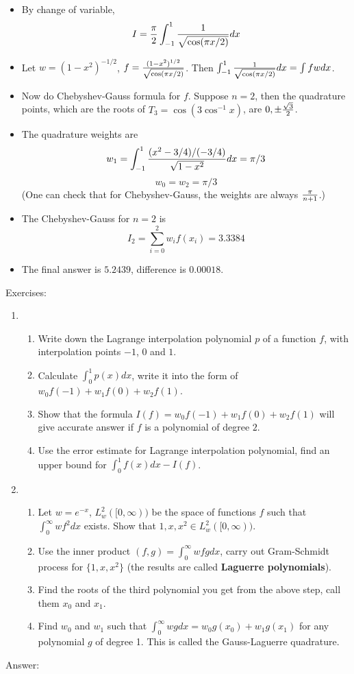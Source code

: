 \documentclass{article} %
\theoremstyle{break}
\begin{document}
\begin{itemize}
\item By change of variable,
  \[I={\pi\over 2}\int_{-1}^1{1\over\sqrt{\cos (\pi x/2)}}dx\]
\item Let $w=(1-x^2)^{-1/2}$, $f={(1-x^2)^{1/2}\over\sqrt{\cos (\pi x/2)}}$. Then $\int_{-1}^1{1\over\sqrt{\cos (\pi x/2)}}dx=\int fwdx$.
\item Now do Chebyshev-Gauss formula for $f$. Suppose $n=2$, then the quadrature points, which are the roots of $T_3=\cos(3\cos^{-1}x)$, are $0, \pm{\sqrt{3}\over 2}$.
\item The quadrature weights are
  \[w_1=\int_{-1}^1{(x^2-3/4)/(-3/4)\over\sqrt{1-x^2}}dx=\pi/3\]
  \[w_0=w_2=\pi/3\]
  (One can check that for Chebyshev-Gauss, the weights are always $\pi\over n+1$.)
\item The Chebyshev-Gauss for $n=2$ is
  \[I_2=\sum_{i=0}^2w_if(x_i)=3.3384\]
\item The final answer is $5.2439$, difference is $0.00018$.
\end{itemize}


Exercises:

\begin{enumerate}
\item \begin{enumerate}
  \item Write down the Lagrange interpolation polynomial $p$ of a function $f$, with interpolation points $-1$, $0$ and $1$.
  \item Calculate $\int_0^1p(x)dx$, write it into the form of $w_0f(-1)+w_1f(0)+w_2f(1)$.
\item Show that the formula $I(f)=w_0f(-1)+w_1f(0)+w_2f(1)$ will give accurate answer if $f$ is a polynomial of degree $2$.
  \item Use the error estimate for Lagrange interpolation polynomial, find an upper bound for $\int_0^1f(x)dx-I(f)$.
  \end{enumerate}
  \item \begin{enumerate}
    \item Let $w=e^{-x}$, $L^2_w([0, \infty))$ be the space of functions $f$ such that $\int_0^\infty wf^2dx$ exists. Show that $1, x, x^2\in L^2_w([0, \infty))$.
     \item Use the inner product $(f, g)=\int_0^\infty wfgdx$, carry out Gram-Schmidt process for $\{1, x, x^2\}$ (the results are called {\bf Laguerre polynomials}).
\item Find the roots of the third polynomial you get from the above step, call them $x_0$ and $x_1$.
    \item Find $w_0$ and $w_1$ such that $\int_0^\infty wgdx=w_0g(x_0)+w_1g(x_1)$ for any polynomial $g$ of degree 1. This is called the Gauss-Laguerre quadrature.
\end{enumerate}

\end{enumerate}
Answer:
\end{document}
